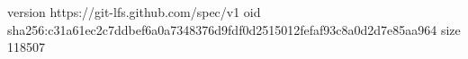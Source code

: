 version https://git-lfs.github.com/spec/v1
oid sha256:c31a61ec2c7ddbef6a0a7348376d9fdf0d2515012fefaf93c8a0d2d7e85aa964
size 118507
